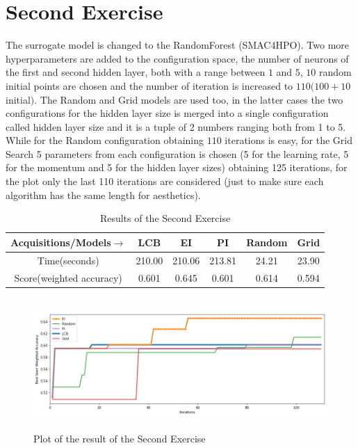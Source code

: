 \documentclass[12pt, onecolumn]{article}
\begin{document}
\section*{Second Exercise}
The surrogate model is changed to the RandomForest (SMAC4HPO).
Two more hyperparameters are added to the configuration space, the number of neurons of the first and second hidden layer, both with a range between $1$ and $5$, $10$ random initial points are chosen and the number of iteration is increased to $110 (100 + 10$ initial$)$.
The Random and Grid models are used too, in the latter cases the two configurations for the hidden layer size is merged into a single configuration called hidden layer size and it is a tuple of 2 numbers ranging both from 1 to 5.\\
While for the Random configuration obtaining $110$ iterations is easy, for the Grid Search 5 parameters from each configuration is chosen (5 for the learning rate, 5 for the momentum and 5 for the hidden layer sizes) obtaining 125 iterations, for the plot only the last 110 iterations are considered (just to make sure each algorithm has the same length for aesthetics).   
\begin{table}[!h]
  \centering
  \begin{tabular}{ |c|c|c|c|c|c| } 
    \hline
    Acquisitions/Models$\to$ & LCB  & EI & PI & Random & Grid \\
    \hline
    Time(seconds) & 210.00 & 210.06 & 213.81 & 24.21 & 23.90\\
    \hline
    Score(weighted accuracy) & 0.601 & 0.645 & 0.601 & 0.614 & 0.594\\ 
    \hline
  \end{tabular}
  \caption{Results of the Second Exercise}
  \label{tab:Ex2_res}
\end{table}

\begin{figure}[!h]
  \centering
  \includegraphics[width=\linewidth, height=5cm]{imgs/second.png}
  \caption{Plot of the result of the Second Exercise}
  \label{fig:second}
\end{figure}
\end{document}

